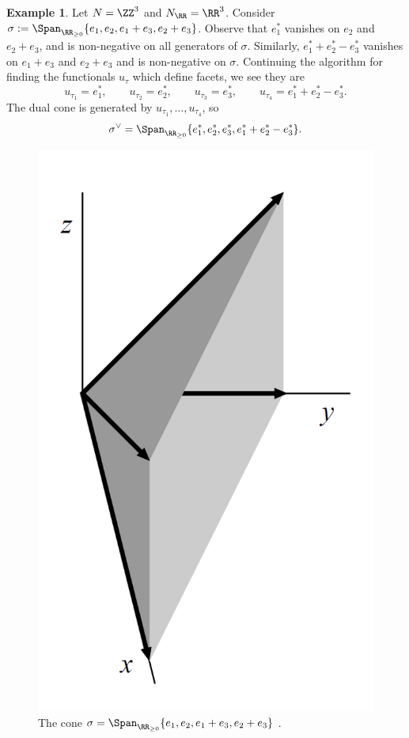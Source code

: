 \documentclass[12pt]{amsart}
\theoremstyle{plain}
\theoremstyle{definition}
\newtheorem{example}[theorem]{Example}
\begin{document}
\begin{example}\label{example:3dconeanddual}
Let $N = \ZZ^3$ and $N_\RR = \RR^3$.
Consider $\sigma := \Span_{\RR_{\ge 0}}\{ e_1, e_2, e_1+e_3, e_2 + e_3\}$.
Observe that $e_1^*$ vanishes on $e_2$ and $e_2+e_3$, and is non-negative on all generators of $\sigma$.
Similarly, $e_1^*+e_2^*-e_3^*$ vanishes on $e_1+e_3$ and $e_2+e_3$ and is non-negative on $\sigma$.
Continuing the algorithm for finding the functionals $u_\tau$ which define facets, we see they are
$$u_{\tau_1} = e_1^*, \qquad u_{\tau_2} = e_2^*, \qquad u_{\tau_3} = e_3^*, \qquad u_{\tau_4} = e_1^* + e_2^* - e_3^*.$$
The dual cone is generated by $u_{\tau_1}, \ldots, u_{\tau_4}$, so
$$\sigma^\vee = \Span_{\RR_{\ge 0}} \{e_1^*, e_2^*, e_3^*, e_1^* +e_2^* - e_3^*\}.$$
\begin{figure}[h]
\includegraphics[width=0.2 \textwidth]{../images/cox cone example 2}
\caption{The cone $\sigma= \Span_{\RR_{\ge 0}}\{ e_1, e_2, e_1+e_3, e_2 + e_3\}$ \cite[Figure 2]{CLS11}.}
\label{figure:3dcone}
\end{figure}
\end{example}
\end{document}
